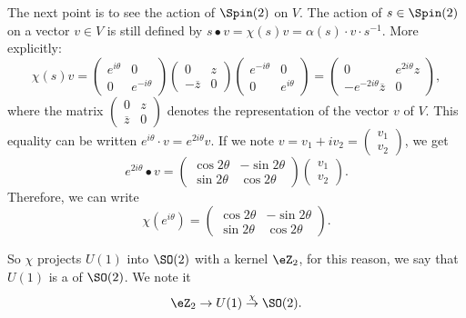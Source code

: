 The next point is to see the action of $\Spin(2)$ on $V$. The action of $s\in\Spin(2)$ on a vector $v\in V$ is still defined by $s\bullet v=\chi(s)v=\alpha(s)\cdot v\cdot s^{-1}$. More explicitly:
\begin{equation}
	\chi(s)v=\begin{pmatrix}
		e^{i\theta} & 0            \\
		0           & e^{-i\theta}
	\end{pmatrix} \begin{pmatrix}
		0             & z \\
		-\overline{z} & 0
	\end{pmatrix} \begin{pmatrix}
		e^{-i\theta} & 0           \\
		0            & e^{i\theta}
	\end{pmatrix}=\begin{pmatrix}
		0                          & e^{2i\theta}z \\
		-e^{-2i\theta}\overline{z} & 0
	\end{pmatrix},
\end{equation}
where the  matrix $\begin{pmatrix}
		0            & z \\
		\overline{z} & 0
	\end{pmatrix} $ denotes the representation of the vector $v$ of $V$. This equality can be written $e^{i\theta}\cdot v=e^{2i\theta}v$. If we note $v=v_1+iv_2=\begin{pmatrix}
		v_1 \\
		v_2
	\end{pmatrix} $, we get
\[ e^{2i\theta}\bullet v=\begin{pmatrix}
		\cos 2\theta & -\sin 2\theta \\
		\sin 2\theta & \cos 2\theta
	\end{pmatrix}\begin{pmatrix}
		v_1 \\
		v_2
	\end{pmatrix}. \]
Therefore, we can write
\[\chi(e^{i\theta})=\begin{pmatrix}
		\cos 2\theta & -\sin 2\theta \\
		\sin 2\theta & \cos 2\theta
	\end{pmatrix}.\]

So $\chi$ projects $U(1)$ into $\SO(2)$ with a kernel $\eZ_2$, for this reason, we say that $U(1)$ is a  of $\SO(2)$. We note it
\begin{equation}
	\eZ_2\rightarrow U(1)\stackrel{\chi}{\rightarrow}\SO(2).
\end{equation}


